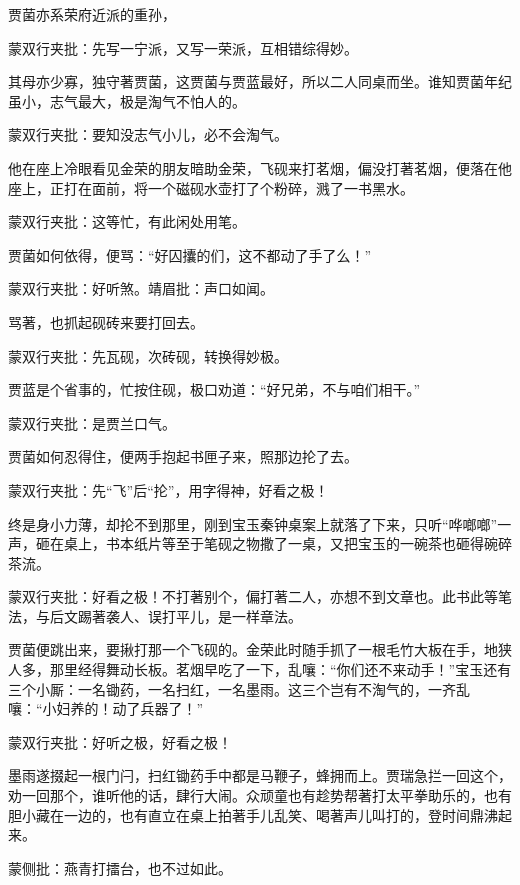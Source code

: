 \begin{parag}
    贾菌亦系荣府近派的重孙，\begin{note}蒙双行夹批：先写一宁派，又写一荣派，互相错综得妙。\end{note}其母亦少寡，独守著贾菌，这贾菌与贾蓝最好，所以二人同桌而坐。谁知贾菌年纪虽小，志气最大，极是淘气不怕人的。\begin{note}蒙双行夹批：要知没志气小儿，必不会淘气。\end{note}他在座上冷眼看见金荣的朋友暗助金荣，飞砚来打茗烟，偏没打著茗烟，便落在他座上，正打在面前，将一个磁砚水壶打了个粉碎，溅了一书黑水。\begin{note}蒙双行夹批：这等忙，有此闲处用笔。\end{note}贾菌如何依得，便骂：“好囚攮的们，这不都动了手了么！”\begin{note}蒙双行夹批：好听煞。靖眉批：声口如闻。\end{note}骂著，也抓起砚砖来要打回去。\begin{note}蒙双行夹批：先瓦砚，次砖砚，转换得妙极。\end{note}贾蓝是个省事的，忙按住砚，极口劝道：“好兄弟，不与咱们相干。”\begin{note}蒙双行夹批：是贾兰口气。\end{note}贾菌如何忍得住，便两手抱起书匣子来，照那边抡了去。\begin{note}蒙双行夹批：先“飞”后“抡”，用字得神，好看之极！\end{note}终是身小力薄，却抡不到那里，刚到宝玉秦钟桌案上就落了下来，只听“哗啷啷”一声，砸在桌上，书本纸片等至于笔砚之物撒了一桌，又把宝玉的一碗茶也砸得碗碎茶流。\begin{note}蒙双行夹批：好看之极！不打著别个，偏打著二人，亦想不到文章也。此书此等笔法，与后文踢著袭人、误打平儿，是一样章法。\end{note}贾菌便跳出来，要揪打那一个飞砚的。金荣此时随手抓了一根毛竹大板在手，地狭人多，那里经得舞动长板。茗烟早吃了一下，乱嚷：“你们还不来动手！”宝玉还有三个小厮：一名锄药，一名扫红，一名墨雨。这三个岂有不淘气的，一齐乱嚷：“小妇养的！动了兵器了！”\begin{note}蒙双行夹批：好听之极，好看之极！\end{note}墨雨遂掇起一根门闩，扫红锄药手中都是马鞭子，蜂拥而上。贾瑞急拦一回这个，劝一回那个，谁听他的话，肆行大闹。众顽童也有趁势帮著打太平拳助乐的，也有胆小藏在一边的，也有直立在桌上拍著手儿乱笑、喝著声儿叫打的，登时间鼎沸起来。\begin{note}蒙侧批：燕青打擂台，也不过如此。\end{note}
\end{parag}


